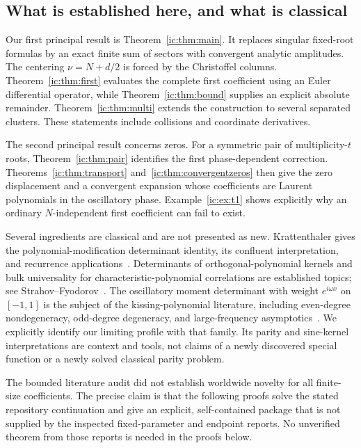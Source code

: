\documentclass[11pt,a4paper]{article}
\numberwithin{equation}{section}
\theoremstyle{definition}
\theoremstyle{remark}
\begin{document}
\subsection{What is established here, and what is classical}
Our first principal result is Theorem~\ref{ic:thm:main}. It replaces singular
fixed-root formulas by an exact finite sum of sectors with convergent
analytic amplitudes. The centering $\nu=N+d/2$ is forced by the
Christoffel columns. Theorem~\ref{ic:thm:first} evaluates the complete first
coefficient using an Euler differential operator, while
Theorem~\ref{ic:thm:bound} supplies an explicit absolute remainder.
Theorem~\ref{ic:thm:multi} extends the construction to several separated
clusters. These statements include collisions and coordinate derivatives.

The second principal result concerns zeros. For a symmetric pair of
multiplicity-$t$ roots, Theorem~\ref{ic:thm:pair} identifies the first
phase-dependent correction. Theorems~\ref{ic:thm:transport}
and~\ref{ic:thm:convergentzeros} then give the zero displacement and a
convergent expansion whose coefficients are Laurent polynomials in the
oscillatory phase. Example~\ref{ic:ex:t1} shows explicitly why an ordinary
$N$-independent first coefficient can fail to exist.

Several ingredients are classical and are not presented as new.
Krattenthaler gives the polynomial-modification determinant identity,
its confluent interpretation, and recurrence applications~\cite{Krattenthaler2023}.
Determinants of orthogonal-polynomial kernels and bulk universality for
characteristic-polynomial correlations are established topics; see
Strahov--Fyodorov~\cite{StrahovFyodorov2003}. The oscillatory moment determinant with weight
$e^{i\omega x}$ on $[-1,1]$ is the subject of the kissing-polynomial
literature, including even-degree nondegeneracy, odd-degree degeneracy,
and large-frequency asymptotics~\cite{CelsusDeanoHuybrechsIserles2022}. We explicitly identify our
limiting profile with that family. Its parity and sine-kernel
interpretations are context and tools, not claims of a newly discovered
special function or a newly solved classical parity problem.

The bounded literature audit did not establish worldwide novelty for
all finite-size coefficients. The precise claim is that the following
proofs solve the stated repository continuation and give an explicit,
self-contained package that is not supplied by the inspected
fixed-parameter and endpoint reports. No unverified theorem from those
reports is needed in the proofs below.
\end{document}
